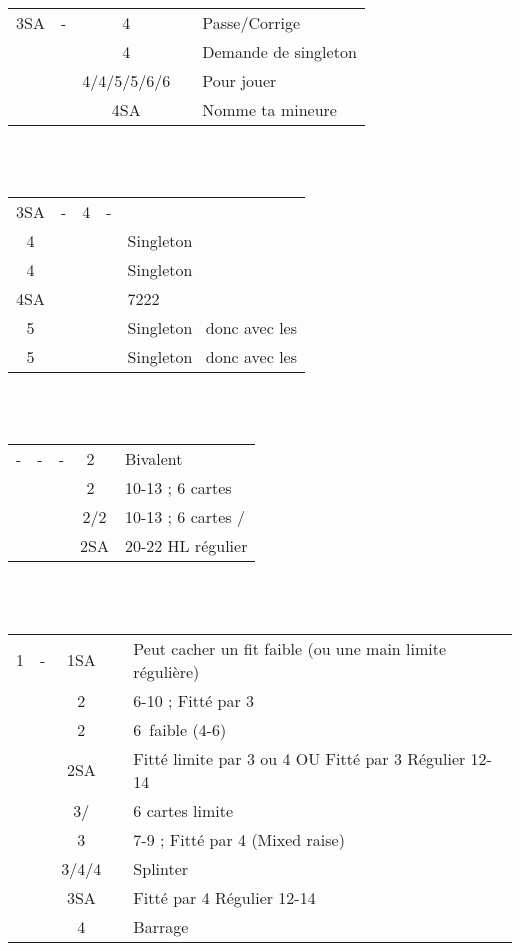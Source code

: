 \documentclass[a4paper, oneside, 11pt]{report}
\begin{document}
	\begin{tabular}{cccc|l}
	3SA & - & 4\trefle && Passe/Corrige\\
	&& 4\carreau && Demande de singleton\\
	&& 4\coeur/4\pique/5\trefle/5\carreau/6\trefle/6\carreau && Pour jouer\\
	&& 4SA && Nomme ta mineure\\
	\end{tabular}\\\\
	
	\begin{tabular}{cccc|l}
	3SA & - & 4\carreau & - &\\
	4\coeur &&&& Singleton \coeur\\
	4\pique &&&& Singleton \pique\\
	4SA &&&& 7222\\
	5\trefle &&&& Singleton \carreau\ donc avec les \trefle\\
	5\carreau &&&& Singleton \trefle\ donc avec les \carreau\\
	\end{tabular}\\\\

	\begin{tabular}{cccc|l}
	- & - & - & 2\trefle\ & Bivalent\\
	&&& 2\carreau\ & 10-13 ; 6 cartes \carreau\\
	&&& 2\coeur/2\pique & 10-13 ; 6 cartes \coeur/\pique\\
	&&& 2SA & 20-22 HL régulier\\
	\end{tabular}\\\\
	
		\begin{tabular}{cccc|l}
		1\coeur & - & 1SA && Peut cacher un fit faible (ou une main limite régulière)\\
		&& 2\coeur && 6-10 ; Fitté par 3\\
		&& 2\pique && 6\pique\ faible (4-6)\\
		&& 2SA && Fitté limite par 3 ou 4 OU Fitté par 3 Régulier 12-14  \\
		&& 3\trefle/\carreau && 6 cartes limite\\
		&& 3\coeur && 7-9 ; Fitté par 4 (Mixed raise)\\
		&& 3\pique/4\trefle/4\carreau && Splinter\\
		&& 3SA && Fitté par 4 Régulier 12-14\\
		&& 4\coeur && Barrage\\
		\end{tabular}\\
\end{document}
